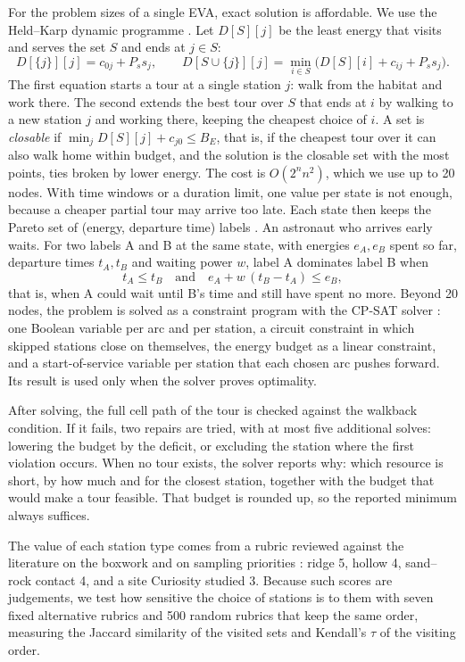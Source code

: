 \documentclass[11pt,a4paper]{article}
\begin{document}
For the problem sizes of a single EVA, exact solution is affordable. We use the Held--Karp dynamic programme \cite{HeldKarp1962}. Let $D[S][j]$ be the least energy that visits and serves the set $S$ and ends at $j \in S$: \[D[\{j\}][j] = c_{0j} + P_s s_j,\qquad D[S \cup \{j\}][j] = \min_{i \in S} \big( D[S][i] + c_{ij} + P_s s_j \big).\] The first equation starts a tour at a single station $j$: walk from the habitat and work there. The second extends the best tour over $S$ that ends at $i$ by walking to a new station $j$ and working there, keeping the cheapest choice of $i$. A set is \emph{closable} if $\min_j D[S][j] + c_{j0} \le B_E$, that is, if the cheapest tour over it can also walk home within budget, and the solution is the closable set with the most points, ties broken by lower energy. The cost is $O(2^n n^2)$, which we use up to 20 nodes. With time windows or a duration limit, one value per state is not enough, because a cheaper partial tour may arrive too late. Each state then keeps the Pareto set of (energy, departure time) labels \cite{Irnich2005}. An astronaut who arrives early waits. For two labels A and B at the same state, with energies $e_A, e_B$ spent so far, departure times $t_A, t_B$ and waiting power $w$, label A dominates label B when \[t_A \le t_B \quad\text{and}\quad e_A + w\,(t_B - t_A) \le e_B,\] that is, when A could wait until B's time and still have spent no more. Beyond 20 nodes, the problem is solved as a constraint program with the CP-SAT solver \cite{ORTools}: one Boolean variable per arc and per station, a circuit constraint in which skipped stations close on themselves, the energy budget as a linear constraint, and a start-of-service variable per station that each chosen arc pushes forward. Its result is used only when the solver proves optimality.

After solving, the full cell path of the tour is checked against the walkback condition. If it fails, two repairs are tried, with at most five additional solves: lowering the budget by the deficit, or excluding the station where the first violation occurs. When no tour exists, the solver reports why: which resource is short, by how much and for the closest station, together with the budget that would make a tour feasible. That budget is rounded up, so the reported minimum always suffices.

The value of each station type comes from a rubric reviewed against the literature on the boxwork and on sampling priorities \cite{Siebach2014,Siebach2026,Hausrath2026,JPL2026,NASA-blog-4804,Herd2025}: ridge 5, hollow 4, sand--rock contact 4, and a site Curiosity studied 3. Because such scores are judgements, we test how sensitive the choice of stations is to them with seven fixed alternative rubrics and 500 random rubrics that keep the same order, measuring the Jaccard similarity of the visited sets and Kendall's $\tau$ of the visiting order.
\end{document}
